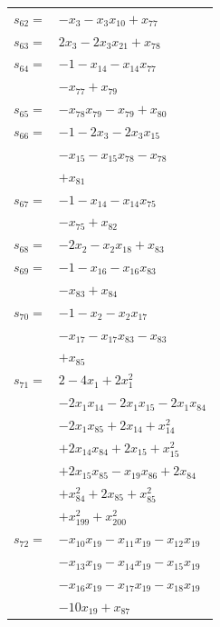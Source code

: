\begin{longtable}{@{}r@{\;}l@{}}
\(s_{62}=\) & \(\displaystyle -x_{3} -x_{3}x_{10} +x_{77}\) \\[3pt]
\(s_{63}=\) & \(\displaystyle 2x_{3} -2x_{3}x_{21} +x_{78}\) \\[3pt]
\(s_{64}=\) & \(\displaystyle -1 -x_{14} -x_{14}x_{77}\) \\
 & \(\displaystyle -x_{77} +x_{79}\) \\[3pt]
\(s_{65}=\) & \(\displaystyle -x_{78}x_{79} -x_{79} +x_{80}\) \\[3pt]
\(s_{66}=\) & \(\displaystyle -1 -2x_{3} -2x_{3}x_{15}\) \\
 & \(\displaystyle -x_{15} -x_{15}x_{78} -x_{78}\) \\
 & \(\displaystyle +x_{81}\) \\[3pt]
\(s_{67}=\) & \(\displaystyle -1 -x_{14} -x_{14}x_{75}\) \\
 & \(\displaystyle -x_{75} +x_{82}\) \\[3pt]
\(s_{68}=\) & \(\displaystyle -2x_{2} -x_{2}x_{18} +x_{83}\) \\[3pt]
\(s_{69}=\) & \(\displaystyle -1 -x_{16} -x_{16}x_{83}\) \\
 & \(\displaystyle -x_{83} +x_{84}\) \\[3pt]
\(s_{70}=\) & \(\displaystyle -1 -x_{2} -x_{2}x_{17}\) \\
 & \(\displaystyle -x_{17} -x_{17}x_{83} -x_{83}\) \\
 & \(\displaystyle +x_{85}\) \\[3pt]
\(s_{71}=\) & \(\displaystyle 2 -4x_{1} +2x_{1}^{2}\) \\
 & \(\displaystyle -2x_{1}x_{14} -2x_{1}x_{15} -2x_{1}x_{84}\) \\
 & \(\displaystyle -2x_{1}x_{85} +2x_{14} +x_{14}^{2}\) \\
 & \(\displaystyle +2x_{14}x_{84} +2x_{15} +x_{15}^{2}\) \\
 & \(\displaystyle +2x_{15}x_{85} -x_{19}x_{86} +2x_{84}\) \\
 & \(\displaystyle +x_{84}^{2} +2x_{85} +x_{85}^{2}\) \\
 & \(\displaystyle +x_{199}^{2} +x_{200}^{2}\) \\[3pt]
\(s_{72}=\) & \(\displaystyle -x_{10}x_{19} -x_{11}x_{19} -x_{12}x_{19}\) \\
 & \(\displaystyle -x_{13}x_{19} -x_{14}x_{19} -x_{15}x_{19}\) \\
 & \(\displaystyle -x_{16}x_{19} -x_{17}x_{19} -x_{18}x_{19}\) \\
 & \(\displaystyle -10x_{19} +x_{87}\) \\[3pt]

\end{longtable}
